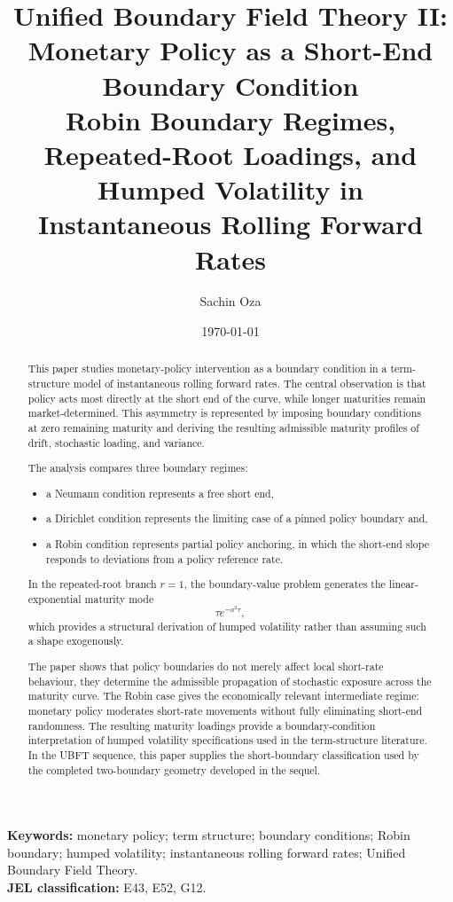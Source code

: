 \documentclass[11pt]{article}
\title{\textbf{Unified Boundary Field Theory II: Monetary Policy as a Short-End Boundary Condition}\\[0.5em]
\large Robin Boundary Regimes, Repeated-Root Loadings, and Humped Volatility in Instantaneous Rolling Forward Rates}
\author{Sachin Oza}
\date{\today}
\numberwithin{equation}{section}
\begin{document}
\maketitle

\begin{abstract}
This paper studies monetary-policy intervention as a boundary condition in a term-structure model of instantaneous rolling forward rates. The central observation is that policy acts most directly at the short end of the curve, while longer maturities remain market-determined. This asymmetry is represented by imposing boundary conditions at zero remaining maturity and deriving the resulting admissible maturity profiles of drift, stochastic loading, and variance.

The analysis compares three boundary regimes: 
\begin{itemize}
    \item a Neumann condition represents a free short end, 
    \item a Dirichlet condition represents the limiting case of a pinned policy boundary and, 
    \item a Robin condition represents partial policy anchoring, in which the short-end slope responds to deviations from a policy reference rate. 
\end{itemize}
In the repeated-root branch $r=1$, the boundary-value problem generates the linear-exponential maturity mode
\[
\tau e^{-a^2\tau},
\]
which provides a structural derivation of humped volatility rather than assuming such a shape exogenously.

The paper shows that policy boundaries do not merely affect local short-rate behaviour, they determine the admissible propagation of stochastic exposure across the maturity curve. The Robin case gives the economically relevant intermediate regime: monetary policy moderates short-rate movements without fully eliminating short-end randomness. The resulting maturity loadings provide a boundary-condition interpretation of humped volatility specifications used in the term-structure literature. In the UBFT sequence, this paper supplies the short-boundary classification used by the completed two-boundary geometry developed in the sequel.
\end{abstract}

\noindent\textbf{Keywords:} monetary policy; term structure; boundary conditions; Robin boundary; humped volatility; instantaneous rolling forward rates; Unified Boundary Field Theory.\\
\textbf{JEL classification:} E43, E52, G12.
\end{document}
